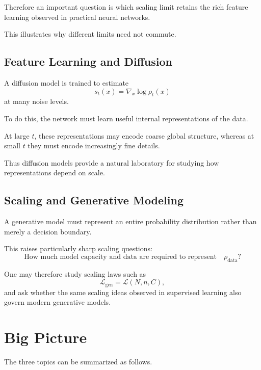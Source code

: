 Therefore an important question is which scaling limit retains the rich feature
learning observed in practical neural networks.

This illustrates why different limits need not commute.


\subsection{Feature Learning and Diffusion}

A diffusion model is trained to estimate
\begin{equation}
    s_t(x)
    =
    \nabla_x\log\rho_t(x)
\end{equation}
at many noise levels.

To do this, the network must learn useful internal representations of the data.

At large $t$, these representations may encode coarse global structure,
whereas at small $t$ they must encode increasingly fine details.

Thus diffusion models provide a natural laboratory for studying how
representations depend on scale.


\subsection{Scaling and Generative Modeling}

A generative model must represent an entire probability distribution rather
than merely a decision boundary.

This raises particularly sharp scaling questions:
\begin{equation}
    \text{How much model capacity and data are required to represent}
    \quad
    \rho_{\mathrm{data}}?
\end{equation}

One may therefore study scaling laws such as
\begin{equation}
    \mathcal L_{\mathrm{gen}}
    =
    \mathcal L(N,n,C),
\end{equation}
and ask whether the same scaling ideas observed in supervised learning also
govern modern generative models.


\section{Big Picture}

The three topics can be summarized as follows.

